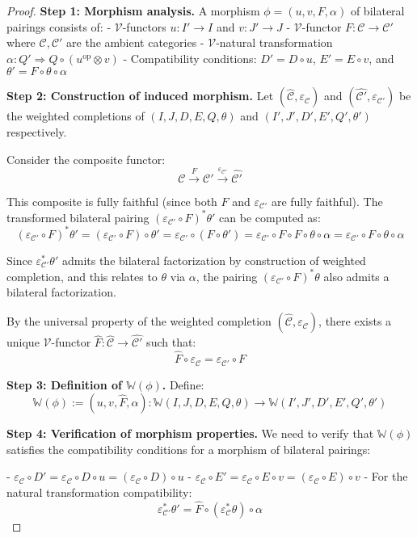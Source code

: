 \documentclass[11pt]{article}
\theoremstyle{plain}
\theoremstyle{definition}
\theoremstyle{remark}
\newcommand{\V}{\mathcal{V}}
\newcommand{\C}{\mathcal{C}}
\newcommand{\op}{\mathrm{op}}
\newcommand{\wh}[1]{\widehat{#1}}
\begin{document}
\begin{proof}
\textbf{Step 1: Morphism analysis.}
A morphism $\phi = (u, v, F, \alpha)$ of bilateral pairings consists of:
- $\V$-functors $u : I' \to I$ and $v : J' \to J$
- $\V$-functor $F : \C \to \C'$ where $\C, \C'$ are the ambient categories
- $\V$-natural transformation $\alpha : Q' \Rightarrow Q \circ (u^{\op} \otimes v)$
- Compatibility conditions: $D' = D \circ u$, $E' = E \circ v$, and $\theta' = F \circ \theta \circ \alpha$

\textbf{Step 2: Construction of induced morphism.}
Let $(\wh{\C}, \varepsilon_\C)$ and $(\wh{\C'}, \varepsilon_{\C'})$ be the weighted completions of $(I, J, D, E, Q, \theta)$ and $(I', J', D', E', Q', \theta')$ respectively.

Consider the composite functor:
$$\C \xrightarrow{F} \C' \xrightarrow{\varepsilon_{\C'}} \wh{\C'}$$

This composite is fully faithful (since both $F$ and $\varepsilon_{\C'}$ are fully faithful). The transformed bilateral pairing $(\varepsilon_{\C'} \circ F)^* \theta'$ can be computed as:
$$(\varepsilon_{\C'} \circ F)^* \theta' = (\varepsilon_{\C'} \circ F) \circ \theta' = \varepsilon_{\C'} \circ (F \circ \theta') = \varepsilon_{\C'} \circ F \circ F \circ \theta \circ \alpha = \varepsilon_{\C'} \circ F \circ \theta \circ \alpha$$

Since $\varepsilon_{\C'}^* \theta'$ admits the bilateral factorization by construction of weighted completion, and this relates to $\theta$ via $\alpha$, the pairing $(\varepsilon_{\C'} \circ F)^* \theta$ also admits a bilateral factorization.

By the universal property of the weighted completion $(\wh{\C}, \varepsilon_\C)$, there exists a unique $\V$-functor $\wh{F} : \wh{\C} \to \wh{\C'}$ such that:
$$\wh{F} \circ \varepsilon_\C = \varepsilon_{\C'} \circ F$$

\textbf{Step 3: Definition of $\mathbb{W}(\phi)$.}
Define:
$$\mathbb{W}(\phi) := (u, v, \wh{F}, \alpha) : \mathbb{W}(I, J, D, E, Q, \theta) \to \mathbb{W}(I', J', D', E', Q', \theta')$$

\textbf{Step 4: Verification of morphism properties.}
We need to verify that $\mathbb{W}(\phi)$ satisfies the compatibility conditions for a morphism of bilateral pairings:

- $\varepsilon_\C \circ D' = \varepsilon_\C \circ D \circ u = (\varepsilon_\C \circ D) \circ u$ 
- $\varepsilon_\C \circ E' = \varepsilon_\C \circ E \circ v = (\varepsilon_\C \circ E) \circ v$ 
- For the natural transformation compatibility:
$$\varepsilon_{\C'}^* \theta' = \wh{F} \circ (\varepsilon_\C^* \theta) \circ \alpha$$


\end{proof}
\end{document}
